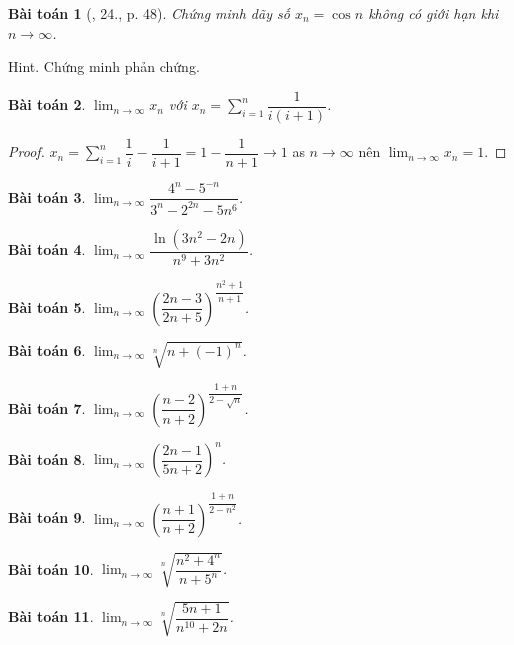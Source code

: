 \documentclass{article}
\newtheorem{baitoan}{Bài toán}
\begin{document}
\begin{baitoan}[\cite{TLCT_BT_dai_so_giai_tich_11}, 24., p. 48]
	Chứng minh dãy số $x_n = \cos n$ không có giới hạn khi $n\to\infty$.
\end{baitoan}
{\sf Hint.} Chứng minh phản chứng.

\begin{baitoan}
	$\lim_{n\to\infty} x_n$ với $x_n = \sum_{i=1}^n \dfrac{1}{i(i + 1)}$.
\end{baitoan}

\begin{proof}
	$x_n = \sum_{i=1}^n \dfrac{1}{i} - \dfrac{1}{i + 1} = 1 - \dfrac{1}{n + 1}\to1$ as $n\to\infty$ nên $\lim_{n\to\infty} x_n = 1$.
\end{proof}

\begin{baitoan}
	$\lim_{n\to\infty} \dfrac{4^n - 5^{-n}}{3^n - 2^{2n} - 5n^6}$.
\end{baitoan}

\begin{baitoan}
	$\lim_{n\to\infty} \dfrac{\ln(3n^2 - 2n)}{n^9 + 3n^2}$.
\end{baitoan}

\begin{baitoan}
	$\lim_{n\to\infty} \left(\dfrac{2n - 3}{2n + 5}\right)^{\dfrac{n^2 + 1}{n + 1}}$.
\end{baitoan}

\begin{baitoan}
	$\lim_{n\to\infty} \sqrt[n]{n + (-1)^n}$.
\end{baitoan}

\begin{baitoan}
	$\lim_{n\to\infty} \left(\dfrac{n - 2}{n + 2}\right)^{\dfrac{1 + n}{2 - \sqrt{n}}}$.
\end{baitoan}

\begin{baitoan}
	$\lim_{n\to\infty} \left(\dfrac{2n - 1}{5n + 2}\right)^n$.
\end{baitoan}

\begin{baitoan}
	$\lim_{n\to\infty} \left(\dfrac{n + 1}{n + 2}\right)^{\dfrac{1 + n}{2 - n^2}}$.
\end{baitoan}

\begin{baitoan}
	$\lim_{n\to\infty} \sqrt[n]{\dfrac{n^2 + 4^n}{n + 5^n}}$.
\end{baitoan}

\begin{baitoan}
	$\lim_{n\to\infty} \sqrt[n]{\dfrac{5n + 1}{n^{10} + 2n}}$.
\end{baitoan}
\end{document}
